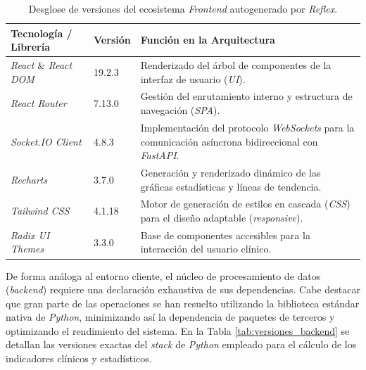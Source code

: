 \begin{table}[hbt!]
\centering
\begin{tabular}{llp{8cm}}
\hline
\textbf{Tecnología / Librería} & \textbf{Versión} & \textbf{Función en la Arquitectura} \\ \hline
\textit{React} \& \textit{React DOM} & 19.2.3 & Renderizado del árbol de componentes de la interfaz de usuario (\textit{UI}). \\ 
\textit{React Router} & 7.13.0 & Gestión del enrutamiento interno y estructura de navegación (\textit{SPA}). \\ 
\textit{Socket.IO Client} & 4.8.3 & Implementación del protocolo \textit{WebSockets} para la comunicación asíncrona bidireccional con \textit{FastAPI}. \\ 
\textit{Recharts} & 3.7.0 & Generación y renderizado dinámico de las gráficas estadísticas y líneas de tendencia. \\ 
\textit{Tailwind CSS} & 4.1.18 & Motor de generación de estilos en cascada (\textit{CSS}) para el diseño adaptable (\textit{responsive}). \\ 
\textit{Radix UI Themes} & 3.3.0 & Base de componentes accesibles para la interacción del usuario clínico. \\ \hline
\end{tabular}
\caption{Desglose de versiones del ecosistema \textit{Frontend} autogenerado por \textit{Reflex}.}
\label{tab:versiones_frontend}
\end{table}

De forma análoga al entorno cliente, el núcleo de procesamiento de datos (\textit{backend}) requiere una declaración exhaustiva de sus dependencias. Cabe destacar que gran parte de las operaciones se han resuelto utilizando la biblioteca estándar nativa de \textit{Python}, minimizando así la dependencia de paquetes de terceros y optimizando el rendimiento del sistema. En la Tabla \ref{tab:versiones_backend} se detallan las versiones exactas del \textit{stack} de \textit{Python} empleado para el cálculo de los indicadores clínicos y estadísticos.

